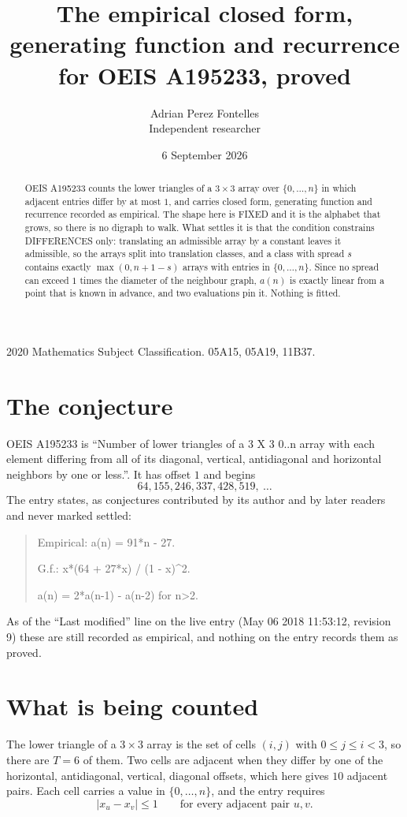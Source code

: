 \documentclass[11pt,a4paper]{article}
\title{The empirical closed form, generating function and recurrence for OEIS A195233, proved}
\author{Adrian Perez Fontelles\\ \small Independent researcher}
\date{6 September 2026}
\theoremstyle{plain}
\theoremstyle{definition}
\begin{document}
\maketitle

\begin{abstract}
OEIS A195233 counts the lower triangles of a $3\times3$ array over $\{0,\dots,n\}$ in which
adjacent entries differ by at most $1$, and carries closed form, generating function and recurrence recorded as empirical. The shape here is FIXED
and it is the alphabet that grows, so there is no digraph to walk. What settles it is that the
condition constrains DIFFERENCES only: translating an admissible array by a constant leaves it
admissible, so the arrays split into translation classes, and a class with spread $s$ contains
exactly $\max(0,n+1-s)$ arrays with entries in $\{0,\dots,n\}$. Since no spread can exceed
$1$ times the diameter of the neighbour graph, $a(n)$ is exactly linear from a point that is
known in advance, and two evaluations pin it. Nothing is fitted.
\end{abstract}

\noindent\small 2020 Mathematics Subject Classification. 05A15, 05A19, 11B37.\normalsize

\section{The conjecture}

OEIS A195233 is ``Number of lower triangles of a 3 X 3 0..n array with each element differing from all of its diagonal, vertical, antidiagonal and horizontal neighbors by one or less.''. It has offset $1$ and begins
\[
64, 155, 246, 337, 428, 519,\ \dots
\]
The entry states, as conjectures contributed by its author and by later readers and never
marked settled:
\begin{quote}
Empirical: a(n) = 91*n - 27.

G.f.: x*(64 + 27*x) / (1 - x)\^{}2.

a(n) = 2*a(n-1) - a(n-2) for n>2.
\end{quote}
As of the ``Last modified'' line on the live entry (May 06 2018 11:53:12, revision 9) these are still
recorded as empirical, and nothing on the entry records them as proved.

\section{What is being counted}

The lower triangle of a $3\times3$ array is the set of cells $(i,j)$ with $0\le j\le
i<3$, so there are $T=6$ of them. Two cells are adjacent when they differ by one of the
horizontal, antidiagonal, vertical, diagonal offsets, which here gives $10$ adjacent pairs. Each cell carries a value in
$\{0,\dots,n\}$, and the entry requires
\[
|x_u-x_v|\le 1\qquad\text{for every adjacent pair }u,v .
\]
\end{document}
